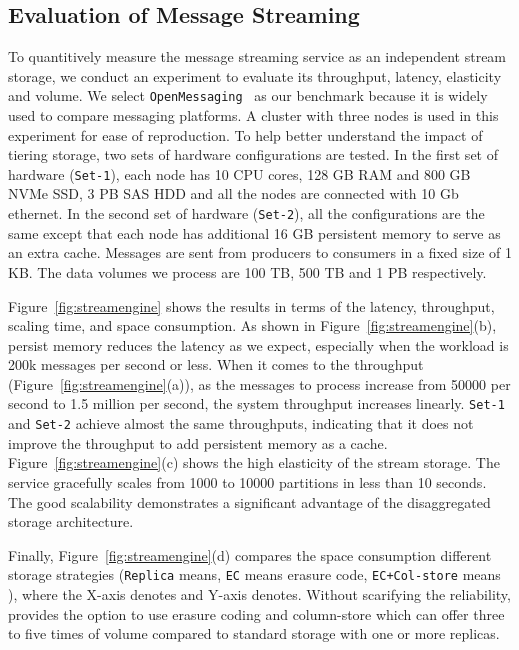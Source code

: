 \subsection{Evaluation of Message Streaming}

To quantitively measure the message streaming service as an independent stream storage, we conduct an experiment to evaluate its throughput, latency, elasticity and volume. We select \texttt{OpenMessaging}~\cite{} as our benchmark  because it is widely used to compare messaging platforms. A cluster with three nodes is used in this experiment for  ease of reproduction.
 To help better understand the impact of tiering storage, two sets of hardware configurations are tested. In the first set of hardware (\texttt{Set-1}), each node has 10 CPU cores, 128 GB RAM and 800 GB NVMe SSD, 3 PB SAS HDD and all the nodes are connected with 10 Gb ethernet. In the second set of hardware (\texttt{Set-2}), all the configurations are the same except that each node has additional 16 GB persistent memory to serve as an extra cache. Messages are sent from producers to consumers in a fixed size of 1 KB. The data volumes we process are 100 TB, 500 TB and 1 PB respectively. 


Figure~\ref{fig:streamengine} shows the results in terms of  the latency, throughput, scaling time, and space consumption.
As shown in Figure~\ref{fig:streamengine}(b), persist memory reduces the latency as we expect, especially when the workload is 200k messages per second or less.
When it comes to the throughput (Figure~\ref{fig:streamengine}(a)), as the messages to process increase from 50000 per second to 1.5 million per second, the system throughput increases linearly. 
\texttt{Set-1} and \texttt{Set-2} achieve almost the same throughputs, indicating that it does not improve the throughput to add persistent memory as a cache. 
 Figure~\ref{fig:streamengine}(c) shows the high elasticity of the stream storage. The service gracefully scales from 1000 to 10000 partitions in less than 10 seconds. The good scalability  demonstrates a significant advantage of the   disaggregated storage architecture. 

Finally, Figure~\ref{fig:streamengine}(d) compares the space consumption different storage strategies (\texttt{Replica} means, \texttt{EC} means erasure code, \texttt{EC+Col-store} means ), where the X-axis denotes and Y-axis denotes.
 Without scarifying the reliability, \sys provides the option to use erasure coding and column-store which can offer three to five times of volume compared to standard storage with one or more replicas. 









